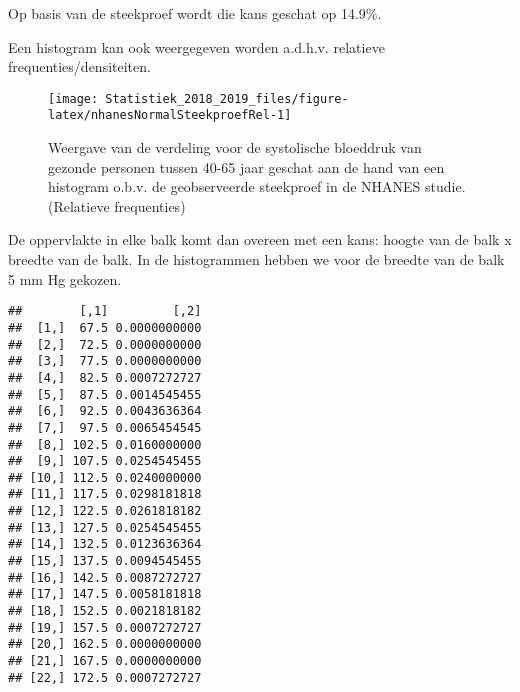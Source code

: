 \documentclass[12pt,dutch,coursenotes]{book}
\newenvironment{Shaded}{\begin{snugshade}}{\end{snugshade}}
\newcommand{\KeywordTok}[1]{\textcolor[rgb]{0.13,0.29,0.53}{\textbf{#1}}}
\newcommand{\DataTypeTok}[1]{\textcolor[rgb]{0.13,0.29,0.53}{#1}}
\newcommand{\DecValTok}[1]{\textcolor[rgb]{0.00,0.00,0.81}{#1}}
\newcommand{\FloatTok}[1]{\textcolor[rgb]{0.00,0.00,0.81}{#1}}
\newcommand{\StringTok}[1]{\textcolor[rgb]{0.31,0.60,0.02}{#1}}
\newcommand{\OtherTok}[1]{\textcolor[rgb]{0.56,0.35,0.01}{#1}}
\newcommand{\OperatorTok}[1]{\textcolor[rgb]{0.81,0.36,0.00}{\textbf{#1}}}
\newcommand{\NormalTok}[1]{#1}
\theoremstyle{definition}
\theoremstyle{definition}
\theoremstyle{definition}
\theoremstyle{remark}
\begin{document}
Op basis van de steekproef wordt die kans geschat op 14.9\%.

Een histogram kan ook weergegeven worden a.d.h.v. relatieve
frequenties/densiteiten.

\begin{Shaded}
\end{Shaded}

\begin{figure}

{\centering \texttt{[image: Statistiek\_2018\_2019\_files/figure-latex/nhanesNormalSteekproefRel-1]} 

}

\caption{Weergave van de verdeling voor de systolische bloeddruk van gezonde personen tussen 40-65 jaar geschat aan de hand van een histogram o.b.v. de geobserveerde steekproef in de NHANES studie. (Relatieve frequenties)}\label{fig:nhanesNormalSteekproefRel}
\end{figure}

De oppervlakte in elke balk komt dan overeen met een kans: hoogte van de
balk x breedte van de balk. In de histogrammen hebben we voor de breedte
van de balk 5 mm Hg gekozen.

\begin{Shaded}
\end{Shaded}

\begin{verbatim}
##        [,1]         [,2]
##  [1,]  67.5 0.0000000000
##  [2,]  72.5 0.0000000000
##  [3,]  77.5 0.0000000000
##  [4,]  82.5 0.0007272727
##  [5,]  87.5 0.0014545455
##  [6,]  92.5 0.0043636364
##  [7,]  97.5 0.0065454545
##  [8,] 102.5 0.0160000000
##  [9,] 107.5 0.0254545455
## [10,] 112.5 0.0240000000
## [11,] 117.5 0.0298181818
## [12,] 122.5 0.0261818182
## [13,] 127.5 0.0254545455
## [14,] 132.5 0.0123636364
## [15,] 137.5 0.0094545455
## [16,] 142.5 0.0087272727
## [17,] 147.5 0.0058181818
## [18,] 152.5 0.0021818182
## [19,] 157.5 0.0007272727
## [20,] 162.5 0.0000000000
## [21,] 167.5 0.0000000000
## [22,] 172.5 0.0007272727
\end{verbatim}
\end{document}
